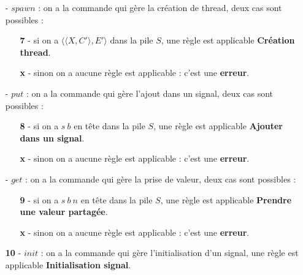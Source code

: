 \documentclass[10pt,a4paper]{report}
\begin{document}
\begin{enumerate}
		\item[-] $spawn$ : on a la commande qui gère la création de thread, deux cas sont possibles : 
		\begin{enumerate}
			\item[\textbf{7} -] si on a $\langle\langle X,C'\rangle,E'\rangle$ dans la pile $S$, une règle est applicable \textbf{Création thread}.
			\item[\textbf{x} -] sinon on a aucune règle est applicable : c'est une \textbf{erreur}. 
		\end{enumerate}
		\medbreak
		
		\item[-] $put$ : on a la commande qui gère l'ajout dans un signal, deux cas sont possibles :
		\begin{enumerate}
			\item[\textbf{8} -] si on a $s~b$ en tête dans la pile $S$, une règle est applicable \textbf{Ajouter dans un signal}.
			\item[\textbf{x} -] sinon on a aucune règle est applicable : c'est une \textbf{erreur}.
		\end{enumerate}
		\medbreak
		
		\item[-] $get$ : on a la commande qui gère la prise de valeur, deux cas sont possibles :
		\begin{enumerate}
			\item[\textbf{9} -] si on a $s~b~n$ en tête dans la pile $S$, une règle est applicable \textbf{Prendre une valeur partagée}.
			\item[\textbf{x} -] sinon on a aucune règle est applicable : c'est une \textbf{erreur}.
		\end{enumerate}
		\medbreak
		
		\item[\textbf{10} -] $init$ : on a la commande qui gère l'initialisation d'un signal, une règle est applicable \textbf{Initialisation signal}.
		\medbreak
		

\end{enumerate}
\end{document}
